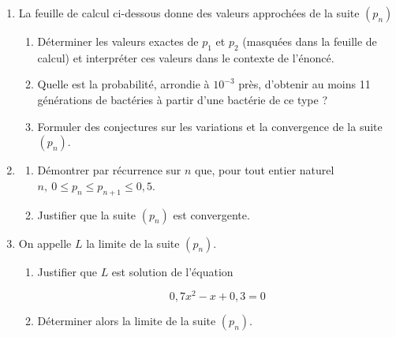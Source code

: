 \begin{minipage}{0.68\linewidth}
\begin{enumerate}
\item La feuille de calcul ci-dessous donne des valeurs approchées de la suite $\left(p_n\right)$
	\begin{enumerate}
		\item Déterminer les valeurs exactes de $p_1$ et $p_2$ (masquées dans la feuille de calcul) et interpréter ces valeurs dans le contexte de l'énoncé.
		\item Quelle est la probabilité, arrondie à $10^{-3}$ près, d'obtenir au moins 11 générations de bactéries à partir d'une bactérie de ce type ?
		\item Formuler des conjectures sur les variations et la convergence de la suite $\left(p_n\right)$.
	\end{enumerate}
\item 
	\begin{enumerate}
		\item Démontrer par récurrence sur $n$ que,
pour tout entier naturel $n,\: 0 \leqslant p_n \leqslant p_{n+1} \leqslant0,5$.
		\item Justifier que la suite $\left(p_n\right)$ est convergente.
	\end{enumerate}
\item On appelle $L$ la limite de la suite $\left(p_n\right)$.
	\begin{enumerate}
		\item Justifier que $L$ est solution de l'équation 
		
		\[0,7x^2 - x  + 0,3 = 0\]
		\item Déterminer alors la limite de la suite $\left(p_n\right)$.
	\end{enumerate}
\end{enumerate}
\end{minipage}\hfill
